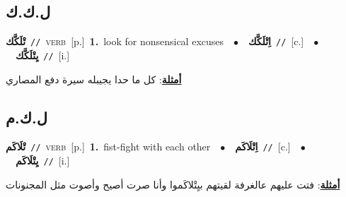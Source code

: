 \documentclass[10pt,a4paper,twoside]{article} %
\begin{document}
\begin{multicols}{2}
\vspace{-3mm}
\subsection*{\color{blue}\foreignlanguage{arabic}{ل.ك.ك}\color{blue}{}} 

{\setlength\topsep{0pt}\textbf{\foreignlanguage{arabic}{تْلَكَّك}}\ {\color{gray}\texttt{//}\color{black}}\ \textsc{verb}\ [p.]\ \textbf{1.}~look for nonsensical excuses\ \ $\bullet$\ \ \setlength\topsep{0pt}\textbf{\foreignlanguage{arabic}{اِتْلَكَّك}}\ {\color{gray}\texttt{//}\color{black}}\ [c.]\ \ $\bullet$\ \ \setlength\topsep{0pt}\textbf{\foreignlanguage{arabic}{يِتْلَكَّك}}\ {\color{gray}\texttt{//}\color{black}}\ [i.]\  \begin{flushright}\color{gray}\foreignlanguage{arabic}{\textbf{\underline{\foreignlanguage{arabic}{أمثلة}}}: كل ما حدا يجيبله سيرة دفع المصاري}\end{flushright}\color{black}} \vspace{2mm}

\vspace{-3mm}
\subsection*{\color{blue}\foreignlanguage{arabic}{ل.ك.م}\color{blue}{}} 

{\setlength\topsep{0pt}\textbf{\foreignlanguage{arabic}{تْلَاكَم}}\ {\color{gray}\texttt{//}\color{black}}\ \textsc{verb}\ [p.]\ \textbf{1.}~fist-fight with each other\ \ $\bullet$\ \ \setlength\topsep{0pt}\textbf{\foreignlanguage{arabic}{اِتْلَاكَم}}\ {\color{gray}\texttt{//}\color{black}}\ [c.]\ \ $\bullet$\ \ \setlength\topsep{0pt}\textbf{\foreignlanguage{arabic}{يِتْلَاكَم}}\ {\color{gray}\texttt{//}\color{black}}\ [i.]\  \begin{flushright}\color{gray}\foreignlanguage{arabic}{\textbf{\underline{\foreignlanguage{arabic}{أمثلة}}}: فتت عليهم عالغرفة لقيتهم بيِتْلاكَموا وأنا صرت أصيح وأصوت مثل المجنونات}\end{flushright}\color{black}} \vspace{2mm}


\end{multicols}
\end{document}
